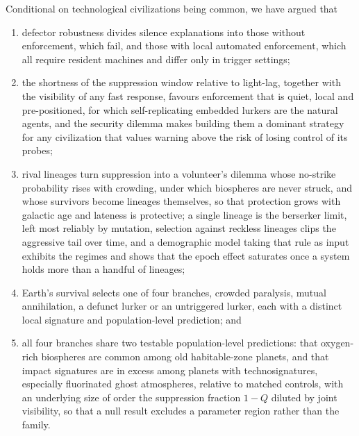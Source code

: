 \documentclass[preprint,12pt]{elsarticle}
\theoremstyle{definition}
\begin{document}
Conditional on technological civilizations being common, we have argued that
\begin{enumerate}
  \item defector robustness divides silence explanations into those without enforcement, which fail, and those with local automated enforcement, which all require resident machines and differ only in trigger settings;
  \item the shortness of the suppression window relative to light-lag, together with the visibility of any fast response, favours enforcement that is quiet, local and pre-positioned, for which self-replicating embedded lurkers are the natural agents, and the security dilemma makes building them a dominant strategy for any civilization that values warning above the risk of losing control of its probes;
  \item rival lineages turn suppression into a volunteer's dilemma whose no-strike probability rises with crowding, under which biospheres are never struck, and whose survivors become lineages themselves, so that protection grows with galactic age and lateness is protective; a single lineage is the berserker limit, left most reliably by mutation, selection against reckless lineages clips the aggressive tail over time, and a demographic model taking that rule as input exhibits the regimes and shows that the epoch effect saturates once a system holds more than a handful of lineages;
  \item Earth's survival selects one of four branches, crowded paralysis, mutual annihilation, a defunct lurker or an untriggered lurker, each with a distinct local signature and population-level prediction; and
  \item all four branches share two testable population-level predictions: that oxygen-rich biospheres are common among old habitable-zone planets, and that impact signatures are in excess among planets with technosignatures, especially fluorinated ghost atmospheres, relative to matched controls, with an underlying size of order the suppression fraction $1 - Q$ diluted by joint visibility, so that a null result excludes a parameter region rather than the family.
\end{enumerate}
\end{document}
